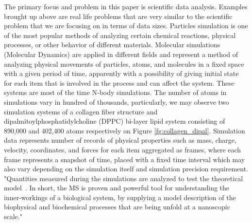 \documentclass[11pt,a4paper]{report}
\begin{document}
The primary focus and problem in this paper is scientific data analysis. Examples brought up above are real life problems that are very similar to the scientific problem that we are focusing on in terms of data sizes. Particles simulation is one of the most popular methods of analyzing certain chemical reactions, physical processes, or other behavior of different materials.
Molecular simulations (Molecular Dynamics) are applied in different fields and represent a method of analyzing physical movements of particles, atoms, and molecules in a fixed space with a given period of time, apparently with a possibility of giving initial state for each item that is involved in the process and can affect the system. These systems are most of the time N-body simulations. The number of atoms in simulations vary in hundred of thousands, particularly, we may observe two simulation systems of a collagen fiber structure and dipalmitoylphosphatidylcholine (DPPC) bi-layer lipid system consisting of 890,000 and 402,400 atoms respectively on Figure \ref{fg:collagen_dipal}. Simulation data represents number of records of physical properties such as mass, charge, velocity, coordinates, and forces for each item aggregated as frames, where each frame represents a snapshot of time, placed with a fixed time interval which may also vary depending on the simulation itself and simulation precision requirement. "Quantities measured during the simulations are analyzed to test the theoretical
model~\cite{Frenkel:api01,Landau:cup05}. In short, the MS is proven
and powerful tool for understanding the inner-workings of a
biological system, by supplying a model description of the
biophysical and biochemical processes that are being unfold at a
nanoscopic scale." \cite{mainPaper}
\end{document}
